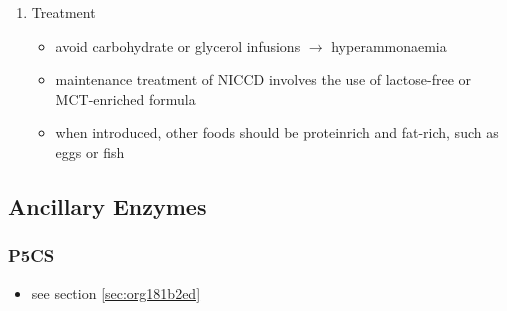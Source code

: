 \documentclass{scrartcl}
\begin{document}
\begin{enumerate}
\item Treatment
\label{sec:org5f951ff}
\begin{itemize}
\item avoid carbohydrate or glycerol infusions \(\to\) hyperammonaemia
\item maintenance treatment of NICCD involves the use of lactose-free or
MCT-enriched formula
\item when introduced, other foods should be proteinrich and fat-rich,
such as eggs or fish
\end{itemize}
\end{enumerate}
\subsection{Ancillary Enzymes}
\label{sec:orgdf9f729}
\subsubsection{P5CS}
\label{sec:orgbca613a}
\begin{itemize}
\item see section \ref{sec:org181b2ed}
\end{itemize}
\end{document}
